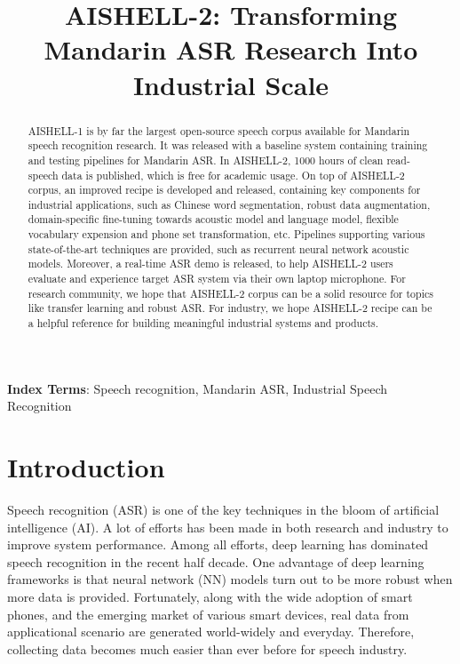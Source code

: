 \documentclass[a4paper]{article}
\title{AISHELL-2: Transforming Mandarin ASR Research Into Industrial Scale}
\begin{document}
\maketitle
%
\begin{abstract}
AISHELL-1 is by far the largest open-source speech corpus available for Mandarin
speech recognition research. It was released with a baseline system containing
training and testing pipelines for Mandarin ASR. In AISHELL-2, 1000 hours of
clean read-speech data is published, which is free for academic usage. On top of
AISHELL-2 corpus, an improved recipe is developed and released, containing key
components for industrial applications, such as Chinese word segmentation,
robust data augmentation, domain-specific fine-tuning towards acoustic model and
language model, flexible vocabulary expension and phone set transformation,
etc. Pipelines supporting various state-of-the-art techniques are provided, such
as recurrent neural network acoustic models. Moreover, a real-time ASR demo is
released, to help AISHELL-2 users evaluate and experience target ASR system via
their own laptop microphone. For research community, we hope that AISHELL-2
corpus can be a solid resource for topics like transfer learning and robust
ASR. For industry, we hope AISHELL-2 recipe can be a helpful reference for
building meaningful industrial systems and products.
\end{abstract}
\noindent\textbf{Index Terms}: Speech recognition, Mandarin ASR, Industrial Speech Recognition

\section{Introduction}

Speech recognition (ASR) is one of the key techniques in the bloom of artificial
intelligence (AI). A lot of efforts has been made in both research and industry
to improve system performance. Among all efforts, deep learning has dominated
speech recognition in the recent half decade. One advantage of deep learning
frameworks is that neural network (NN) models turn out to be more robust when
more data is provided. Fortunately, along with the wide adoption of smart
phones, and the emerging market of various smart devices, real data from
applicational scenario are generated world-widely and everyday. Therefore,
collecting data becomes much easier than ever before for speech industry.
\end{document}

